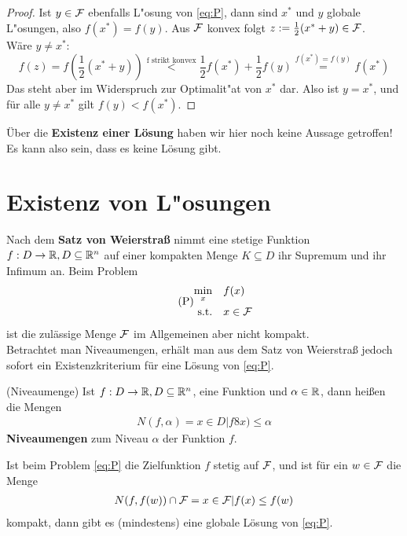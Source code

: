 \begin{proof}
Ist $y \in \mathcal{F}$ ebenfalls L"osung von \eqref{eq:P}, dann sind $x^*$ und $y$ globale L"osungen, also $f(x^*)=f(y)$.
Aus $\mathcal{F}$ konvex folgt $z:=\frac{1}{2}(x^*+y) \in \mathcal{F}$. \\
Wäre $y\neq x^*$:
\begin{equation*}
f(z)=f(\frac{1}{2}(x^*+y)) \overset{\text{f strikt konvex}}{<} \frac{1}{2}f(x^*) + \frac{1}{2}f(y)\overset{f(x^*)=f(y)}{=} f(x^*)
\end{equation*}
Das steht aber im Widerspruch zur Optimalit"at von $x^*$ dar. Also ist $y=x^*$, und für alle $y\neq x^*$ gilt $f(y)<f(x^*)$.
\end{proof}

\begin{Bemerkung}
	Über die \textbf{Existenz einer L\"osung} haben wir hier noch keine Aussage getroffen! Es kann also sein, dass es keine Lösung gibt.
\end{Bemerkung}

\section{Existenz von L"osungen}

Nach dem \textbf{Satz von Weierstraß} nimmt eine stetige Funktion $f : D \rightarrow \mathbb R, D \subseteq \mathbb R^n$ auf einer kompakten Menge $K \subseteq D$ ihr Supremum und ihr Infimum an. Beim Problem
	\begin{gather*} 
  		\tag{P}
  			\begin{aligned}
    			\min_x
    			& & & f(x) \\
    			\text{s.t.}
    			& & & x\in \mathcal{F}
  			\end{aligned}
	\end{gather*}
ist die zulässige Menge $\mathcal{F}$ im Allgemeinen aber nicht kompakt.\\
Betrachtet man Niveaumengen, erhält man aus dem Satz von Weierstraß jedoch sofort ein Existenzkriterium für eine Lösung von \eqref{eq:P}.
\begin{Definition}(Niveaumenge)
Ist $f : D \rightarrow \mathbb R, D \subseteq \mathbb R^n$, eine Funktion und $\alpha \in \mathbb R$, dann heißen die Mengen
\begin{align*}
N(f,\alpha)={x \in D | f8x)\leq \alpha}
\end{align*}
\textbf{Niveaumengen} zum Niveau $\alpha$ der Funktion $f$.
\end{Definition}

\begin{Satz}
Ist beim Problem \eqref{eq:P} die Zielfunktion $f$ stetig auf $\mathcal{F}$, und ist für ein $w \in \mathcal{F}$ die Menge 
\begin{align*}
N(f, f (w))\cap \mathcal{F} = {x \in \mathcal{F} | f(x) \leq f(w)}
\end{align*}
kompakt, dann gibt es (mindestens) eine globale Lösung von \eqref{eq:P}.
\end{Satz}

